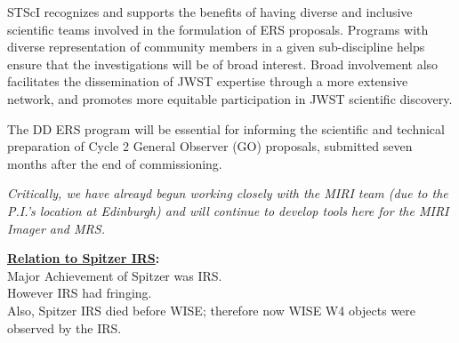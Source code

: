 \smallskip \smallskip
\noindent
STScI recognizes and supports the benefits of having diverse and inclusive scientific teams involved in the formulation of ERS proposals.  Programs with diverse representation of community members in a given sub-discipline helps ensure that the investigations will be of broad interest. Broad involvement also facilitates the dissemination of JWST expertise through a more extensive network, and promotes more equitable participation in JWST scientific discovery.

\smallskip \smallskip
\noindent
The DD ERS program will be essential for informing the scientific and technical preparation of Cycle 2 General Observer (GO) proposals, submitted seven months after the end of commissioning.

{\it Critically, we have alreayd begun working closely with the MIRI team (due to the P.I.'s location at Edinburgh) and will continue to develop tools here for the MIRI Imager and MRS.}



\medskip
\medskip
\smallskip
\smallskip
\noindent
{\bf \underline{Relation to Spitzer IRS}:}\\

Major Achievement of Spitzer was IRS. \\
However IRS had fringing. \\
Also, Spitzer IRS died before WISE; therefore now WISE W4 objects were observed by the IRS.\\


